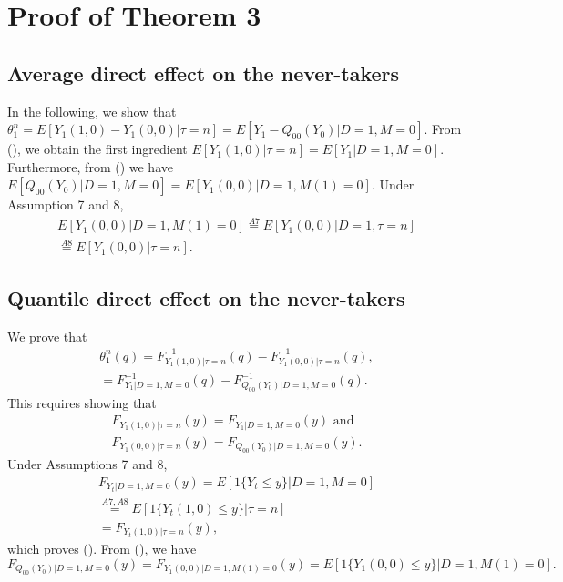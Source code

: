 \documentclass[a4paper,12pt]{article}
\begin{document}
 \doublespacing \pagestyle{plain}
\section{Proof of Theorem 3 }
\subsection{Average direct effect on the never-takers}
In the following, we show that $\theta_1^n= E[Y_1(1,0)-Y_1(0,0)|\tau=n]= E[Y_1-Q_{00}(Y_0)|D=1,M=0]$. From (), we obtain the first ingredient $E[Y_1(1,0)|\tau=n]=E[Y_1|D=1,M=0]$. Furthermore, from () we have $E[Q_{00}(Y_0)|D=1,M=0] = E[Y_1(0,0)|D=1,M(1)=0]$. Under Assumption 7 and 8,
\begin{equation}  \begin{array}{rl} E[Y_1(0,0)|D=1,M(1)=0]\stackrel{A7}{=}E[Y_1(0,0)|D=1,\tau=n]\\\stackrel{A8}{=}E[Y_1(0,0)|\tau=n].
\end{array} \end{equation}
\subsection{Quantile direct effect on the never-takers}
We prove that
\begin{align*}
\theta_1^n (q)= F_{Y_{1}(1,0)|\tau=n}^{-1}(q)- F_{Y_{1}(0,0)|\tau=n}^{-1}(q), \\
= F_{Y_1|D=1,M=0}^{-1}(q)-F_{Q_{00}(Y_{0})|D=1,M=0}^{-1}(q).
\end{align*}
 This requires showing that
\begin{align}
F_{Y_{1}(1,0)|\tau=n}(y) =F_{Y_1|D=1,M=0}(y) \mbox{ and} \\
F_{Y_{1}(0,0)|\tau=n}(y) = F_{Q_{00}(Y_{0})|D=1,M=0}(y). 
\end{align}
Under Assumptions 7 and 8,
\begin{equation} 
\begin{array}{rl}
F_{Y_t|D=1,M=0} (y) = E[1\{Y_t\leq y\}|D=1,M=0] \\ \stackrel{A7,A8}{=}E[1\{Y_t(1,0)\leq y\}|\tau=n] \\ = F_{Y_{t}(1,0)|\tau=n} (y), \end{array}
\end{equation}
which proves (). From (), we have
\begin{equation*}
F_{Q_{00}(Y_{0})|D=1,M=0}(y) = F_{Y_{1}(0,0)|D=1,M(1)=0} (y) = E[1\{Y_1(0,0) \leq y\}|D=1,M(1)=0].
\end{equation*}
\end{document}
